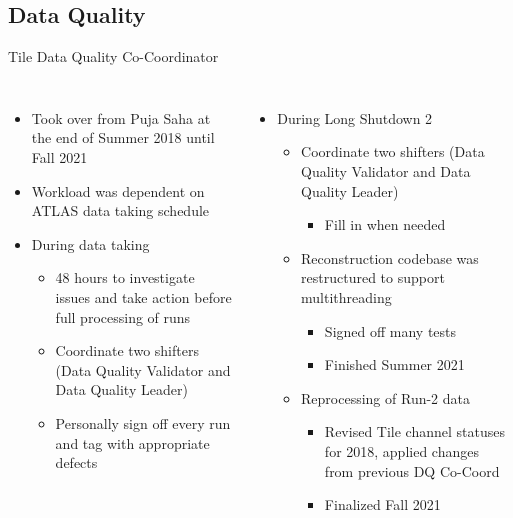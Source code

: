 \documentclass[aspectratio=169,xcolor=table]{beamer}
\begin{document}
  \subsection{Data Quality}

    \begin{frame}[t]{Tile Data Quality Co-Coordinator}
      \begin{columns}
        \begin{itemize}
          \item Took over from Puja Saha at the end of Summer 2018 until Fall 2021
          \item Workload was dependent on ATLAS data taking schedule
            \item During data taking
            \begin{itemize}
              \item 48 hours to investigate issues and take action before full processing of runs
              \item Coordinate two shifters (Data Quality Validator and Data Quality Leader)
              \item Personally sign off every run and tag with appropriate defects
            \end{itemize}
        \end{itemize}

        \begin{itemize}
          \item During Long Shutdown 2
          \begin{itemize}
            \item Coordinate two shifters (Data Quality Validator and Data Quality Leader)
            \begin{itemize}
              \item Fill in when needed
            \end{itemize}
            \item Reconstruction codebase was restructured to support multithreading
            \begin{itemize}
              \item Signed off many tests
              \item Finished Summer 2021
            \end{itemize}
            \item Reprocessing of Run-2 data
            \begin{itemize}
              \item Revised Tile channel statuses for 2018, applied changes from previous DQ Co-Coord
              \item Finalized Fall 2021
            \end{itemize}
          \end{itemize}
        \end{itemize}
      \end{columns}
    \end{frame}
\end{document}
